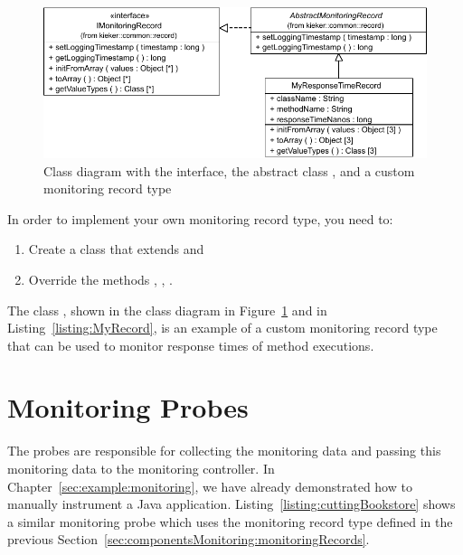 \begin{figure}[h]\centering
\includegraphics[scale=0.7]{images/kieker_MyRTRecord-modified}
\caption{Class diagram with the  interface, the abstract %
class , and a custom monitoring record type %
}
\label{sec:monitoringrecord:interfacesAndImplementingClasses}
\end{figure}

\noindent In order to implement your own monitoring record type, you need to:

\begin{enumerate}
\item Create a class that extends   and
\item Override the methods , , .
\end{enumerate}

\noindent The class , shown in the class diagram in %
Figure~\ref{sec:monitoringrecord:interfacesAndImplementingClasses} and in %
Listing~\ref{listing:MyRecord}, is an example of a custom monitoring record type %
that can be used to monitor response times of method executions.

\setJavaCodeListing



\section{Monitoring Probes}\label{sec:monitoring:probe}

The probes are responsible for collecting the monitoring data and passing this %
monitoring data to the monitoring controller. %
In Chapter~\ref{sec:example:monitoring}, we have already demonstrated how to %
manually instrument a Java application. Listing~\ref{listing:cuttingBookstore} %
shows a similar monitoring probe which uses the monitoring record type %
 defined in the previous Section~\ref{sec:componentsMonitoring:monitoringRecords}.

